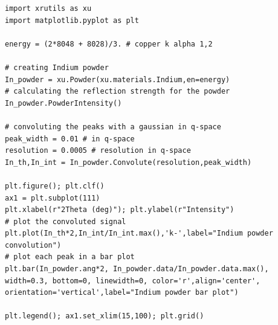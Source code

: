 \begin{lstlisting}[caption=simulation of an powder diffraction scan and two distinct ways of plotting the results]
import xrutils as xu
import matplotlib.pyplot as plt

energy = (2*8048 + 8028)/3. # copper k alpha 1,2

# creating Indium powder 
In_powder = xu.Powder(xu.materials.Indium,en=energy)
# calculating the reflection strength for the powder
In_powder.PowderIntensity()

# convoluting the peaks with a gaussian in q-space
peak_width = 0.01 # in q-space
resolution = 0.0005 # resolution in q-space
In_th,In_int = In_powder.Convolute(resolution,peak_width)

plt.figure(); plt.clf()
ax1 = plt.subplot(111)
plt.xlabel(r"2Theta (deg)"); plt.ylabel(r"Intensity")
# plot the convoluted signal
plt.plot(In_th*2,In_int/In_int.max(),'k-',label="Indium powder convolution")
# plot each peak in a bar plot
plt.bar(In_powder.ang*2, In_powder.data/In_powder.data.max(), width=0.3, bottom=0, linewidth=0, color='r',align='center', orientation='vertical',label="Indium powder bar plot")

plt.legend(); ax1.set_xlim(15,100); plt.grid()
\end{lstlisting}

 
